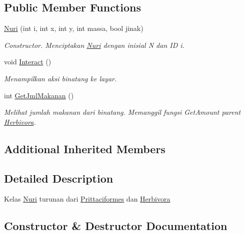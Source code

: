 \subsection*{Public Member Functions}
\begin{DoxyCompactItemize}
\item 
\hyperlink{classNuri_a41b91cafa881ba61c923fa9b160625de}{Nuri} (int i, int x, int y, int massa, bool jinak)
\begin{DoxyCompactList}\small\item\em Constructor. Menciptakan \hyperlink{classNuri}{Nuri} dengan inisial \textquotesingle{}N\textquotesingle{} dan ID i. \end{DoxyCompactList}\item 
void \hyperlink{classNuri_a3162b27769471b4820e2c12a5e6ce986}{Interact} ()\hypertarget{classNuri_a3162b27769471b4820e2c12a5e6ce986}{}\label{classNuri_a3162b27769471b4820e2c12a5e6ce986}

\begin{DoxyCompactList}\small\item\em Menampilkan aksi binatang ke layar. \end{DoxyCompactList}\item 
int \hyperlink{classNuri_ac3bacc743d41a816b8852efe0d2b221c}{Get\+Jml\+Makanan} ()
\begin{DoxyCompactList}\small\item\em Melihat jumlah makanan dari binatang. Memanggil fungsi Get\+Amount parent \hyperlink{classHerbivora}{Herbivora}. \end{DoxyCompactList}\end{DoxyCompactItemize}
\subsection*{Additional Inherited Members}


\subsection{Detailed Description}
Kelas \hyperlink{classNuri}{Nuri} turunan dari \hyperlink{classPrittaciformes}{Prittaciformes} dan \hyperlink{classHerbivora}{Herbivora} 

\subsection{Constructor \& Destructor Documentation}
